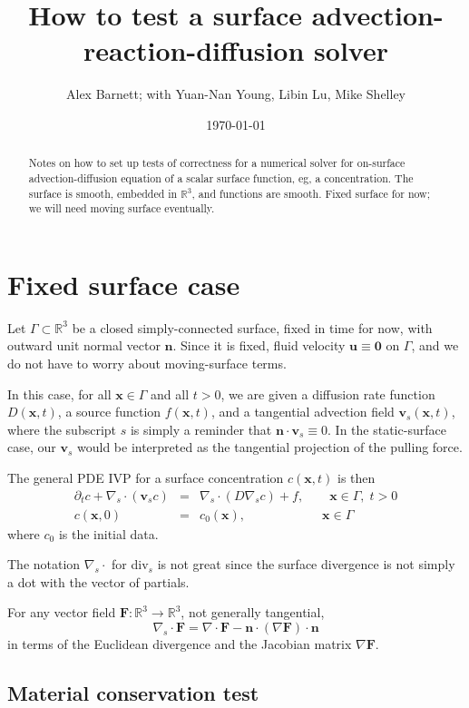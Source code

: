 \documentclass[11pt]{article}
\newcommand{\be}{\begin{equation}}
\newcommand{\ee}{\end{equation}}
\newcommand{\bea}{\begin{eqnarray}}
\newcommand{\eea}{\end{eqnarray}}
\newcommand{\mbf}[1]{{\mathbf #1}}
\newcommand{\qqquad}{\qquad\qquad}
\newcommand{\R}{\mathbb{R}}
\newcommand{\x}{\mbf{x}}
\newcommand{\n}{\mbf{n}}
\newcommand{\vv}{\mbf{v}}
\begin{document}
\title{How to test a surface advection-reaction-diffusion solver}
\author{Alex Barnett; with Yuan-Nan Young, Libin Lu, Mike Shelley}
\date{\today}
\maketitle
\begin{abstract}
  Notes on how to set up tests of correctness for a numerical solver
  for on-surface advection-diffusion equation of a scalar surface function,
  eg, a concentration.
  The surface is smooth, embedded in $\R^3$, and functions are smooth.
  Fixed surface for now; we will need moving surface eventually.
\end{abstract}


\section{Fixed surface case}
\label{s:fixed}

Let $\Gamma \subset \R^3$ be a closed simply-connected surface,
fixed in time for now, with outward unit normal vector $\n$.
Since it is fixed, fluid velocity $\mbf{u}\equiv \mbf{0}$ on $\Gamma$,
and we do not have to worry about moving-surface terms.

In this case,
for all $\x\in\Gamma$ and all $t>0$,
we are given a diffusion rate function $D(\x,t)$,
a source function $f(\x,t)$,
and a tangential advection field $\vv_s(\x,t)$,
where the subscript $s$ is simply a reminder that
$\n\cdot\vv_s\equiv 0$.
In the static-surface case, our $\vv_s$ would be interpreted as the tangential
projection of the pulling force.

The general PDE IVP for a surface concentration $c(\x,t)$ is then
\bea
\partial_t c + \nabla_s \cdot(\vv_s c) &= &\nabla_s \cdot (D \nabla_s c) + f
, \qquad \x\in\Gamma, \;t>0
\label{pde}
\\
c(\x,0) & = & c_0(\x), \qqquad\qquad \x\in\Gamma
\label{ic}
\eea
where $c_0$ is the initial data.

The notation $\nabla_s \cdot$ for div$_s$ is not great since the
surface divergence is not simply a dot with the vector of partials.

For any vector field $\mbf{F}:\R^3\to\R^3$, not generally tangential,
\be
\nabla_s \cdot \mbf{F} = 
\nabla \cdot \mbf{F} - \n\cdot(\nabla \mbf{F}) \cdot \n
\label{divs}
\ee
in terms of the Euclidean divergence and the Jacobian matrix
$\nabla \mbf{F}$.


\subsection{Material conservation test}
\end{document}
